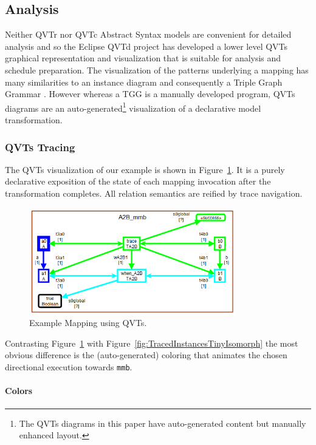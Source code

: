 \documentclass{jot}
\begin{document}
\subsection{Analysis}

Neither QVTr nor QVTc Abstract Syntax models are convenient for detailed analysis and so the Eclipse QVTd project has developed a lower level QVTs graphical representation and visualization that is suitable for analysis and schedule preparation. The visualization of the patterns underlying a mapping has many similarities to an instance diagram and consequently a Triple Graph Grammar \cite{TGG-Optimization}. However whereas a TGG is a manually developed program, QVTs diagrams are an auto-generated\footnote{The QVTs diagrams in this paper have auto-generated content but manually enhanced layout.} visualization of a declarative model transformation. 

\subsubsection{QVTs Tracing}

The QVTs visualization of our example is shown in Figure~\ref{fig:QVTsTinyIsomorph}. It is a purely declarative exposition of the state of each mapping invocation after the transformation completes. All relation semantics are reified by trace navigation.

\begin{figure}[h]
	\centering
	\includegraphics[width=0.8\textwidth]{QVTsTinyIsomorph.png}
	\caption{Example Mapping using QVTs.}
	\label{fig:QVTsTinyIsomorph}
\end{figure}

Contrasting Figure~\ref{fig:QVTsTinyIsomorph} with Figure~\ref{fig:TracedInstancesTinyIsomorph} the most obvious difference is the (auto-generated) coloring that animates the chosen directional execution towards \verb|mmb|.

\paragraph{Colors}
 
\end{document}
